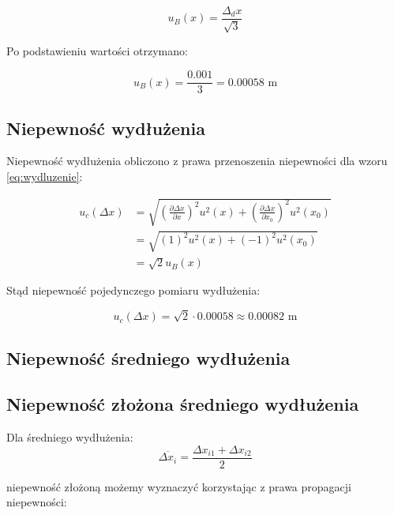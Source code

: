 \documentclass[a4paper,12pt]{article}
\begin{document}
\begin{equation*}
    u_B(x) = \frac{\Delta_d x}{\sqrt{3}}
\end{equation*}

Po podstawieniu wartości otrzymano:

\begin{equation*}
    u_B(x) = \frac{0.001}{3} = 0.00058 \text{ m}
\end{equation*}

\subsection{Niepewność wydłużenia}

Niepewność wydłużenia obliczono z prawa przenoszenia niepewności dla wzoru \ref{eq:wydluzenie}:

\begin{align*}
    u_c(\Delta x) & = \sqrt{\left(\frac{\partial \Delta x}{\partial x}\right)^2 u^2(x) + \left(\frac{\partial \Delta x}{\partial x_0}\right)^2 u^2(x_0)} \\
                  & = \sqrt{(1)^2 u^2(x) + (-1)^2 u^2(x_0)}                                                                                              \\
                  & = \sqrt{2} u_B(x)
\end{align*}

Stąd niepewność pojedynczego pomiaru wydłużenia:

\begin{equation*}
    u_c(\Delta x) = \sqrt{2} \cdot 0.00058 \approx 0.00082 \text{ m}
\end{equation*}

\subsection{Niepewność średniego wydłużenia}

\subsection*{Niepewność złożona średniego wydłużenia}

Dla średniego wydłużenia:
\begin{equation*}
    \overline{\Delta x_i} = \frac{\Delta x_{i1} + \Delta x_{i2}}{2}
\end{equation*}

niepewność złożoną możemy wyznaczyć korzystając z prawa propagacji niepewności:
\end{document}
